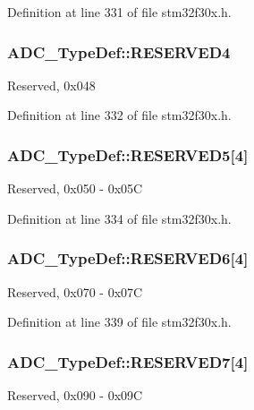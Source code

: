 Definition at line 331 of file stm32f30x.\-h.

\hypertarget{struct_a_d_c___type_def_a09db4799beea24a29003049cd0c37c0f}{
\subsubsection[{R\-E\-S\-E\-R\-V\-E\-D4}]{ A\-D\-C\-\_\-\-Type\-Def\-::\-R\-E\-S\-E\-R\-V\-E\-D4}}\label{struct_a_d_c___type_def_a09db4799beea24a29003049cd0c37c0f}
Reserved, 0x048 

Definition at line 332 of file stm32f30x.\-h.

\hypertarget{struct_a_d_c___type_def_a493d06dfdd25a614290df54467a78348}{
\subsubsection[{R\-E\-S\-E\-R\-V\-E\-D5}]{ A\-D\-C\-\_\-\-Type\-Def\-::\-R\-E\-S\-E\-R\-V\-E\-D5\mbox{[}4\mbox{]}}}\label{struct_a_d_c___type_def_a493d06dfdd25a614290df54467a78348}
Reserved, 0x050 -\/ 0x05\-C 

Definition at line 334 of file stm32f30x.\-h.

\hypertarget{struct_a_d_c___type_def_a88e899f86a7e3c7af30d561c59673812}{
\subsubsection[{R\-E\-S\-E\-R\-V\-E\-D6}]{ A\-D\-C\-\_\-\-Type\-Def\-::\-R\-E\-S\-E\-R\-V\-E\-D6\mbox{[}4\mbox{]}}}\label{struct_a_d_c___type_def_a88e899f86a7e3c7af30d561c59673812}
Reserved, 0x070 -\/ 0x07\-C 

Definition at line 339 of file stm32f30x.\-h.

\hypertarget{struct_a_d_c___type_def_a5bc7bf8bf72fa68fa6fe17e3f70ed892}{
\subsubsection[{R\-E\-S\-E\-R\-V\-E\-D7}]{ A\-D\-C\-\_\-\-Type\-Def\-::\-R\-E\-S\-E\-R\-V\-E\-D7\mbox{[}4\mbox{]}}}\label{struct_a_d_c___type_def_a5bc7bf8bf72fa68fa6fe17e3f70ed892}
Reserved, 0x090 -\/ 0x09\-C 

